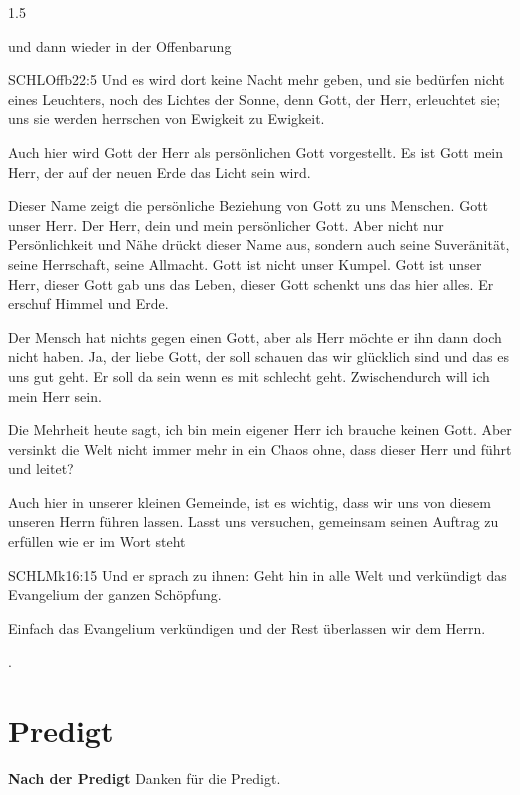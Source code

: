 \documentclass[fontsize=14pt]{../../inc/mybib}
\begin{document}
\begin{spacing}{1.5}
\begin{block}
        und dann wieder in der Offenbarung
        \begin{bibelbox}{SCHL}{Offb}{22:5}
            Und es wird dort keine Nacht mehr geben, und sie bedürfen nicht eines Leuchters, noch des Lichtes der Sonne, denn Gott, der Herr, erleuchtet sie; uns sie werden herrschen von Ewigkeit zu Ewigkeit.
        \end{bibelbox}
        Auch hier wird Gott der Herr als persönlichen Gott vorgestellt. Es ist Gott mein Herr, der auf der neuen Erde das Licht sein wird.

    \end{block}
    \begin{block}[Ende]

        Dieser Name zeigt die persönliche Beziehung von Gott zu uns Menschen. Gott unser Herr. Der Herr, dein und mein persönlicher Gott. Aber nicht nur Persönlichkeit und Nähe drückt dieser Name aus, sondern auch seine Suveränität, seine Herrschaft, seine Allmacht. Gott ist nicht unser Kumpel. Gott ist unser Herr, dieser Gott gab uns das Leben, dieser Gott schenkt uns das hier alles. Er erschuf Himmel und Erde. 
        
        Der Mensch hat nichts gegen einen Gott, aber als Herr möchte er ihn dann doch nicht haben. Ja, der liebe Gott, der soll schauen das wir glücklich sind und das es uns gut geht. Er soll da sein wenn es mit schlecht geht. Zwischendurch will ich mein Herr sein.

        Die Mehrheit heute sagt, ich bin mein eigener Herr ich brauche keinen Gott. Aber versinkt die Welt nicht immer mehr in ein Chaos ohne, dass dieser Herr und führt und leitet?

        Auch hier in unserer kleinen Gemeinde, ist es wichtig, dass wir uns von diesem unseren Herrn führen lassen. Lasst uns versuchen, gemeinsam seinen Auftrag zu erfüllen wie er im Wort steht
        \begin{bibelbox}{SCHL}{Mk}{16:15}
            Und er sprach zu ihnen: Geht hin in alle Welt und verkündigt das Evangelium der ganzen Schöpfung.
        \end{bibelbox}
        Einfach das Evangelium verkündigen und der Rest überlassen wir dem Herrn.

    \end{block}
    .
\end{spacing}
\section{Predigt}
\textbf{Nach der Predigt}\newline
Danken für die Predigt.
\end{document}
